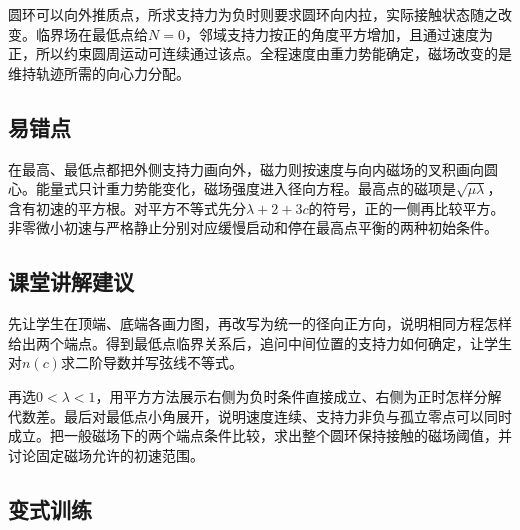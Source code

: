 \documentclass[UTF8,fontset=fandol,a4paper,11pt]{ctexart}
\begin{document}
圆环可以向外推质点，所求支持力为负时则要求圆环向内拉，实际接触状态随之改变。临界场在最低点给$N=0$，邻域支持力按正的角度平方增加，且通过速度为正，所以约束圆周运动可连续通过该点。全程速度由重力势能确定，磁场改变的是维持轨迹所需的向心力分配。



\subsection*{易错点}

在最高、最低点都把外侧支持力画向外，磁力则按速度与向内磁场的叉积画向圆心。能量式只计重力势能变化，磁场强度进入径向方程。最高点的磁项是$\sqrt{\mu\lambda}$，含有初速的平方根。对平方不等式先分$\lambda+2+3c$的符号，正的一侧再比较平方。非零微小初速与严格静止分别对应缓慢启动和停在最高点平衡的两种初始条件。



\subsection*{课堂讲解建议}

先让学生在顶端、底端各画力图，再改写为统一的径向正方向，说明相同方程怎样给出两个端点。得到最低点临界关系后，追问中间位置的支持力如何确定，让学生对$n(c)$求二阶导数并写弦线不等式。

再选$0<\lambda<1$，用平方方法展示右侧为负时条件直接成立、右侧为正时怎样分解代数差。最后对最低点小角展开，说明速度连续、支持力非负与孤立零点可以同时成立。把一般磁场下的两个端点条件比较，求出整个圆环保持接触的磁场阈值，并讨论固定磁场允许的初速范围。



\subsection*{变式训练}
\end{document}
